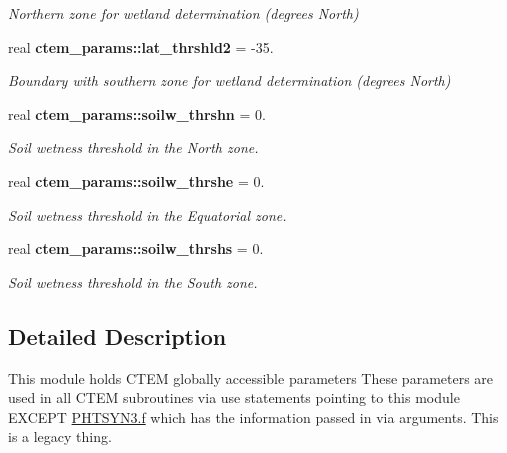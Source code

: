\begin{DoxyCompactItemize}
\begin{DoxyCompactList}\small\item\em Northern zone for wetland determination (degrees North) \end{DoxyCompactList}\item 
\hypertarget{namespacectem__params_ac0a149191207794d3a3867a93efc5757}{}real {\bfseries ctem\+\_\+params\+::lat\+\_\+thrshld2} = -\/35.\label{namespacectem__params_ac0a149191207794d3a3867a93efc5757}

\begin{DoxyCompactList}\small\item\em Boundary with southern zone for wetland determination (degrees North) \end{DoxyCompactList}\item 
\hypertarget{namespacectem__params_ab4795b61fccde1fc82638b5f8b9624aa}{}real {\bfseries ctem\+\_\+params\+::soilw\+\_\+thrshn} = 0.\label{namespacectem__params_ab4795b61fccde1fc82638b5f8b9624aa}

\begin{DoxyCompactList}\small\item\em Soil wetness threshold in the North zone. \end{DoxyCompactList}\item 
\hypertarget{namespacectem__params_adfd72c895e5b156dfa2bab6d694ab849}{}real {\bfseries ctem\+\_\+params\+::soilw\+\_\+thrshe} = 0.\label{namespacectem__params_adfd72c895e5b156dfa2bab6d694ab849}

\begin{DoxyCompactList}\small\item\em Soil wetness threshold in the Equatorial zone. \end{DoxyCompactList}\item 
\hypertarget{namespacectem__params_ae3cc62b58531c7d353cc8baac1c1fd6a}{}real {\bfseries ctem\+\_\+params\+::soilw\+\_\+thrshs} = 0.\label{namespacectem__params_ae3cc62b58531c7d353cc8baac1c1fd6a}

\begin{DoxyCompactList}\small\item\em Soil wetness threshold in the South zone. \end{DoxyCompactList}\end{DoxyCompactItemize}


\subsection{Detailed Description}
This module holds C\+T\+E\+M globally accessible parameters These parameters are used in all C\+T\+E\+M subroutines via use statements pointing to this module E\+X\+C\+E\+P\+T \hyperlink{PHTSYN3_8f}{P\+H\+T\+S\+Y\+N3.\+f} which has the information passed in via arguments. This is a legacy thing. 

